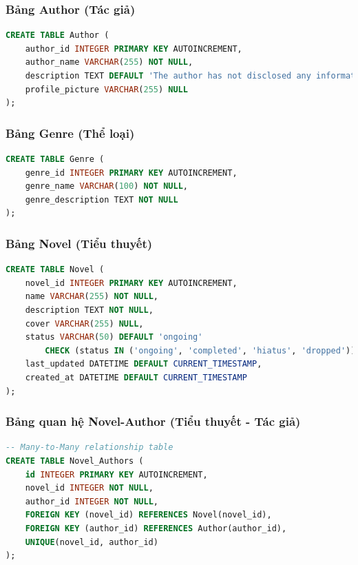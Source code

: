 \documentclass[12pt,aspectratio=169,handout]{beamer}
\begin{document}
\begin{frame}[fragile]
\frametitle{Bảng Author (Tác giả)}
\begin{lstlisting}[language=SQL, basicstyle=\small\ttfamily]
CREATE TABLE Author (
    author_id INTEGER PRIMARY KEY AUTOINCREMENT,
    author_name VARCHAR(255) NOT NULL,
    description TEXT DEFAULT 'The author has not disclosed any information about themselves.',
    profile_picture VARCHAR(255) NULL
);
\end{lstlisting}
\end{frame}

\begin{frame}[fragile]
\frametitle{Bảng Genre (Thể loại)}
\begin{lstlisting}[language=SQL, basicstyle=\small\ttfamily]
CREATE TABLE Genre (
    genre_id INTEGER PRIMARY KEY AUTOINCREMENT,
    genre_name VARCHAR(100) NOT NULL,
    genre_description TEXT NOT NULL
);
\end{lstlisting}
\end{frame}

\begin{frame}
\frametitle{Bảng Novel (Tiểu thuyết)}
\begin{lstlisting}[language=SQL, basicstyle=\small\ttfamily]
CREATE TABLE Novel (
    novel_id INTEGER PRIMARY KEY AUTOINCREMENT,
    name VARCHAR(255) NOT NULL,
    description TEXT NOT NULL,
    cover VARCHAR(255) NULL,
    status VARCHAR(50) DEFAULT 'ongoing' 
        CHECK (status IN ('ongoing', 'completed', 'hiatus', 'dropped')),
    last_updated DATETIME DEFAULT CURRENT_TIMESTAMP,
    created_at DATETIME DEFAULT CURRENT_TIMESTAMP
);
\end{lstlisting}
\end{frame}

\begin{frame}[fragile]
\frametitle{Bảng quan hệ Novel-Author (Tiểu thuyết - Tác giả)}
\begin{lstlisting}[language=SQL, basicstyle=\small\ttfamily]
-- Many-to-Many relationship table
CREATE TABLE Novel_Authors (
    id INTEGER PRIMARY KEY AUTOINCREMENT,
    novel_id INTEGER NOT NULL,
    author_id INTEGER NOT NULL,
    FOREIGN KEY (novel_id) REFERENCES Novel(novel_id),
    FOREIGN KEY (author_id) REFERENCES Author(author_id),
    UNIQUE(novel_id, author_id)
);
\end{lstlisting}
\end{frame}
\end{document}
